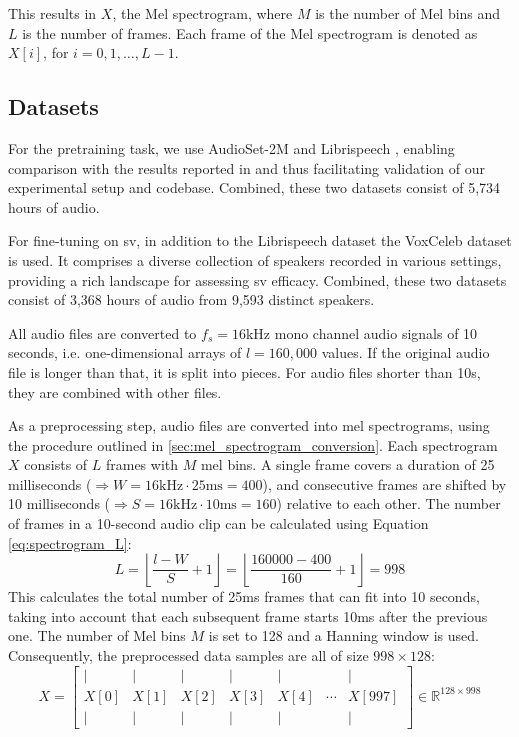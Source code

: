 This results in ${X}$, the Mel spectrogram, where $M$ is the number of Mel bins and $L$ is the number of frames. Each frame of the Mel spectrogram is denoted as ${X}[i]$, for $i = 0, 1, \ldots, L-1$.

\subsection{Datasets}

For the pretraining task, we use AudioSet-2M \cite{gemmeke2017audio} and Librispeech \cite{panayotov2015librispeech}, enabling comparison with the results reported in \cite{gong2022ssast} and thus facilitating validation of our experimental setup and codebase. Combined, these two datasets consist of 5,734 hours of audio. 

For fine-tuning on \gls{sv}, in addition to the Librispeech dataset the VoxCeleb dataset \cite{nagrani2017voxceleb} is used. It comprises a diverse collection of speakers recorded in various settings, providing a rich landscape for assessing \gls{sv} efficacy. Combined, these two datasets consist of 3,368 hours of audio from 9,593 distinct speakers.

All audio files are converted to $f_s=16$kHz mono channel audio signals of 10 seconds, i.e. one-dimensional arrays of $l=160{,}000$ values. If the original audio file is longer than that, it is split into pieces. For audio files shorter than 10s, they are combined with other files.

As a preprocessing step, audio files are converted into mel spectrograms, using the procedure outlined in \ref{sec:mel_spectrogram_conversion}. Each spectrogram $X$ consists of $L$ frames with $M$ mel bins. A single frame covers a duration of 25 milliseconds ($\Rightarrow W=16\text{kHz}\cdot25\text{ms}=400$), and consecutive frames are shifted by 10 milliseconds ($\Rightarrow S=16\text{kHz}\cdot10\text{ms}=160$) relative to each other. The number of frames in a 10-second audio clip can be calculated using Equation \ref{eq:spectrogram_L}:
$$
L = \left\lfloor \frac{l - W}{S} + 1 \right\rfloor = \left\lfloor \frac{160000 - 400}{160} + 1 \right\rfloor = 998
$$
This calculates the total number of 25ms frames that can fit into 10 seconds, taking into account that each subsequent frame starts 10ms after the previous one. The number of Mel bins $M$ is set to 128 and a Hanning window is used. Consequently, the preprocessed data samples are all of size $998 \times 128$:
\[
    X =
    \begin{bmatrix}
    \vert & \vert & \vert & \vert & \vert &       & \vert  \\
    X[0]  & X[1]  & X[2]  & X[3]  & X[4]  &\cdots & X[997] \\
    \vert & \vert & \vert & \vert & \vert &       & \vert
    \end{bmatrix}
    \in \mathbb{R}^{128 \times 998}
\]



